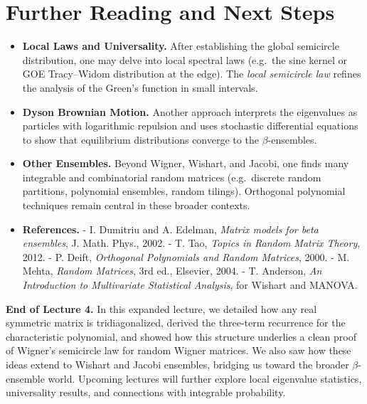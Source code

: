 \documentclass[letterpaper,11pt,oneside,reqno]{article}
\numberwithin{equation}{section}
\theoremstyle{definition}
\begin{document}
\section{Further Reading and Next Steps}

\begin{itemize}
\item {\bf Local Laws and Universality.} After establishing the global semicircle distribution, one may delve into local spectral laws (e.g.\ the sine kernel or GOE Tracy–Widom distribution at the edge). The \emph{local semicircle law} refines the analysis of the Green’s function in small intervals.
\item {\bf Dyson Brownian Motion.} Another approach interprets the eigenvalues as particles with logarithmic repulsion and uses stochastic differential equations to show that equilibrium distributions converge to the $\beta$-ensembles.
\item {\bf Other Ensembles.} Beyond Wigner, Wishart, and Jacobi, one finds many integrable and combinatorial random matrices (e.g.\ discrete random partitions, polynomial ensembles, random tilings). Orthogonal polynomial techniques remain central in these broader contexts.
\item {\bf References.}
  - I. Dumitriu and A. Edelman, \emph{Matrix models for beta ensembles}, J. Math. Phys., 2002.
  - T. Tao, \emph{Topics in Random Matrix Theory}, 2012.
  - P. Deift, \emph{Orthogonal Polynomials and Random Matrices}, 2000.
  - M. Mehta, \emph{Random Matrices}, 3rd ed., Elsevier, 2004.
  - T. Anderson, \emph{An Introduction to Multivariate Statistical Analysis}, for Wishart and MANOVA.
\end{itemize}


\bigskip
\noindent
\textbf{End of Lecture 4.} In this expanded lecture, we detailed how any real symmetric matrix is tridiagonalized, derived the three-term recurrence for the characteristic polynomial, and showed how this structure underlies a clean proof of Wigner’s semicircle law for random Wigner matrices. We also saw how these ideas extend to Wishart and Jacobi ensembles, bridging us toward the broader \(\beta\)-ensemble world. Upcoming lectures will further explore local eigenvalue statistics, universality results, and connections with integrable probability.
\end{document}
